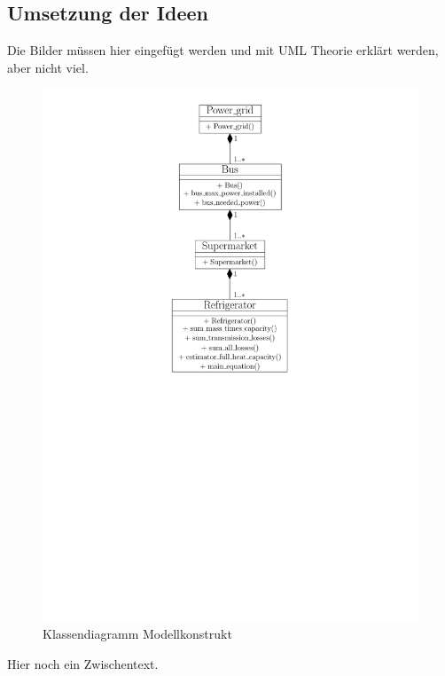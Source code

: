 \subsection{Umsetzung der Ideen}
Die Bilder müssen hier eingefügt werden und mit UML Theorie erklärt werden, aber nicht viel.
\begin{figure}[h]
\caption{Klassendiagramm Modellkonstrukt}
	\label{klassendiagramm}
	\begin{center}
	\includegraphics[scale=0.8]{images/Theorie_Super/class_diagramm}
	\end{center}
\end{figure}

Hier noch ein Zwischentext.

